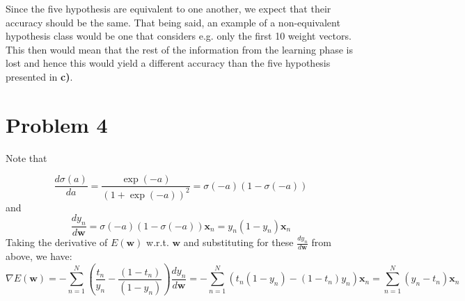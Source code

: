 \documentclass{article}
\begin{document}
Since the five hypothesis are equivalent to one another, we expect that their accuracy should be the same. That being said, an example of a non-equivalent hypothesis class would be one that considers e.g. only the first 10 weight vectors. This then would mean that the rest of the information from the learning phase is lost and hence this would yield a different accuracy than the five hypothesis presented in \textbf{c)}.
\section{Problem 4}

Note that

\begin{equation*}
\frac{d \sigma(a)}{d a} = \frac{\exp(-a)}{(1+ \exp(-a))^2} = \sigma(-a) (1-\sigma(-a))
\end{equation*}
and
\begin{equation*}
\frac{d y_n}{d \mathbf{w}} = \sigma(-a) (1-\sigma(-a)) \mathbf{x}_n = y_n (1-y_n) \mathbf{x}_n
\end{equation*}
Taking the derivative of $E(\mathbf{w})$ w.r.t. $\mathbf{w}$ and substituting for these $\frac{d y_n}{d \mathbf{w}}$ from above, we have:
\begin{equation*}
\nabla E(\mathbf{w}) = -\sum_{n=1}^N (\frac{t_n}{y_n}  - \frac{(1-t_n)}{(1-y_n)}) \frac{d y_n}{d \mathbf{w}} = -\sum_{n=1}^N (t_n(1-y_n)-(1-t_n)y_n) \mathbf{x}_n = \sum_{n=1}^N(y_n - t_n)\mathbf{x}_n
\end{equation*} 
\end{document}

